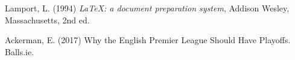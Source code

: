 \begin{thebibliography}{a}

	 Lamport, L. (1994) \emph{\LaTeX: a document preparation system}, Addison Wesley, Massachusetts, 2nd ed.

	 Ackerman, E. (2017) Why the English Premier League Should Have Playoffs. Balls.ie.

\end{thebibliography}
%
%